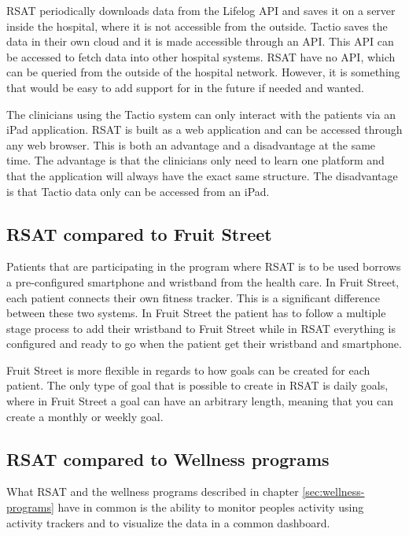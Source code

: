 \documentclass{cslthse-msc}
\begin{document}
RSAT periodically downloads data from the Lifelog API and saves it on a server inside the hospital, where it is not accessible from the outside. Tactio saves the data in their own cloud and it is made accessible through an API. This API can be accessed to fetch data into other hospital systems. RSAT have no API, which can be queried from the outside of the hospital network. However, it is something that would be easy to add support for in the future if needed and wanted.  

The  clinicians using the Tactio system can only interact with the patients via an iPad application. RSAT is built as a web application and can be accessed through any web browser. This is both an advantage and a disadvantage at the same time. The advantage is that the clinicians only need to learn one platform and that the application will always have the exact same structure. The disadvantage is that Tactio data only can be accessed from an iPad.

\subsection{RSAT compared to Fruit Street}

Patients that are participating in the program where RSAT is to be used borrows a pre-configured smartphone and wristband from the health care. In Fruit Street, each patient connects their own fitness tracker. This is a significant difference between these two systems. In Fruit Street the patient has to follow a multiple stage process to add their wristband to Fruit Street  while in RSAT everything is configured and ready to go when the patient get their wristband and smartphone. 

Fruit Street is more flexible in regards to how goals can be created for each patient. The only type of goal that is possible to create in RSAT is daily goals, where in Fruit Street a goal can have an arbitrary length, meaning that you can create a monthly or weekly goal.

\subsection{RSAT compared to Wellness programs}

What RSAT and the wellness programs described in chapter \ref{sec:wellness-programs} have in common is the ability to monitor peoples activity using activity trackers and to visualize the data in a common dashboard. 
\end{document}
